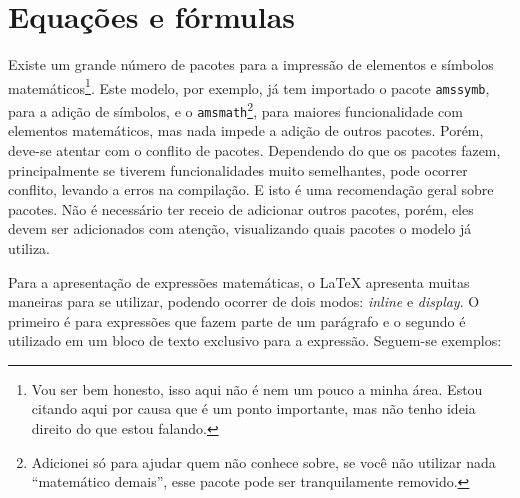 
\section{Equações e fórmulas}
  Existe um grande número de pacotes para a impressão de elementos e símbolos matemáticos\footnote{Vou ser bem honesto, isso aqui não é nem um pouco a minha área. Estou citando aqui por causa que é um ponto importante, mas não tenho ideia direito do que estou falando.}. Este modelo, por exemplo, já tem importado o pacote \texttt{amssymb}, para a adição de símbolos, e o \texttt{amsmath}\footnote{Adicionei só para ajudar quem não conhece sobre, se você não utilizar nada ``matemático demais'', esse pacote pode ser tranquilamente removido.}, para maiores funcionalidade com elementos matemáticos, mas nada impede a adição de outros pacotes. Porém, deve-se atentar com o  conflito de pacotes. Dependendo do que os pacotes fazem, principalmente se tiverem funcionalidades muito semelhantes, pode ocorrer conflito, levando a erros na compilação. E isto é uma recomendação geral sobre pacotes. Não é necessário ter receio de adicionar outros pacotes, porém, eles devem ser adicionados com atenção, visualizando quais pacotes o modelo já utiliza.

  Para a apresentação de expressões matemáticas, o \LaTeX{} apresenta muitas maneiras para se utilizar, podendo ocorrer de dois modos: \textit{inline} e \textit{display}. O primeiro é para expressões que fazem parte de um parágrafo e o segundo é utilizado em um bloco de texto exclusivo para a expressão. Seguem-se exemplos:

